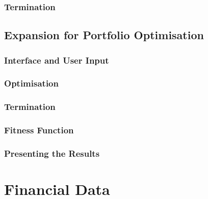 \documentclass{pdfmx4020}
\begin{document}
    \subsection{Termination} %
    \label{sub:termination}
    

  \section{Expansion for Portfolio Optimisation} %
  \label{sec:expansion_for_portfolio_optimisation}

    \subsection{Interface and User Input} %
    \label{sub:interface_and_user_input}
    
    \subsection{Optimisation} %
    \label{sub:optimisation}
    
    \subsection{Termination} %
    \label{sub:termination}
    
    \subsection{Fitness Function} %
    \label{sub:fitness_function}
    
    \subsection{Presenting the Results} %
    \label{sub:presenting_the_results}
    


\chapter{Financial Data}
\end{document}
